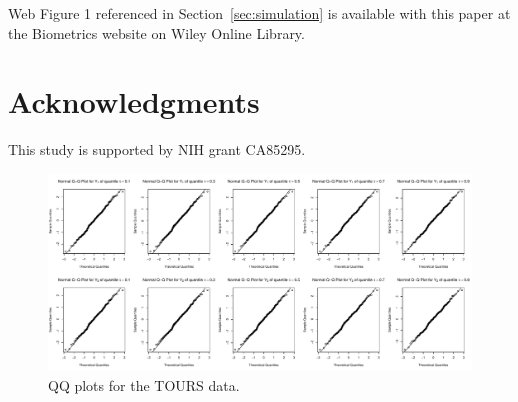 \documentclass[useAMS,usenatbib,referee]{biom}
\begin{document}
Web Figure 1 referenced in Section~\ref{sec:simulation} is available
with this paper at the Biometrics website on Wiley Online Library.
\vspace*{-8pt}



\section*{Acknowledgments}

This study is supported by NIH grant CA85295.






\begin{figure}
\centerline{\includegraphics[scale = .4 ]{../image/ToursGoF}}
\caption{QQ plots for the TOURS data.}
\label{fig1}
\end{figure}

\label{lastpage}
\end{document}
